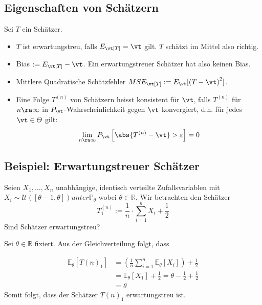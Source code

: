 \subsection{Eigenschaften von Schätzern}
Sei $T$ ein Schätzer.
\begin{itemize}
  \item $T$ ist erwartungstreu, falls $E_\vt[T] = \vt$ gilt. $T$ schätzt
        im Mittel also richtig.
  \item Bias $:= E_\vt[T] - \vt$. Ein erwartungstreuer Schätzer hat also keinen Bias.
  \item Mittlere Quadratische Schätzfehler $MSE_\vt[T] := E_\vt[ {(T - \vt)}^2]$.
  \item Eine Folge $T^{ (n)}$ von Schätzern heisst konsistent für $\vt$, falls $T^{
              (n)}$ für $n \ra \infty$ in $P_\vt$-Wahrscheinlichkeit gegen $\vt$ konvergiert,
        d.h. für jedes $\vt \in \varTheta$ gilt:
        \begin{align*}
          \lim_{n \ra \infty} P_\vt \left[ \abs{T^{ (n)} - \vt} > \varepsilon \right] = 0
        \end{align*}
\end{itemize}
\BoxStart{}
\subsection{Beispiel: Erwartungstreuer Schätzer}
Seien $X_1, \ldots, X_n$ unabhängige, identisch verteilte Zufallsvariablen mit $X_i \sim \mathcal{U}([\theta - 1, \theta]) unter \mathbb{P}_\theta$
wobei $\theta \in \mathbb{R}$. Wir betrachten den Schätzer
\[T_1^{(n)} := \frac{1}{n} \cdot \sum_{i = 1}^n X_i + \frac{1}{2}\]
Sind Schätzer erwartungstreu?

Sei $\theta \in \mathbb{R}$ fixiert. Aus der Gleichverteilung folgt, dass

\begin{align*}
  \mathbb{E}_{\theta}[{T(n)}_1] & = \left(\frac{1}{n} \sum_{i=1}^{n} \mathbb{E}_{\theta}[X_i]\right) + \frac{1}{2} \\
                                & = \mathbb{E}_{\theta}[X_1] + \frac{1}{2} = \theta - \frac{1}{2} + \frac{1}{2}    \\
                                & = \theta
\end{align*}
Somit folgt, dass der Schätzer ${T(n)}_1$ erwartungstreu ist.

\BoxEnd{}
